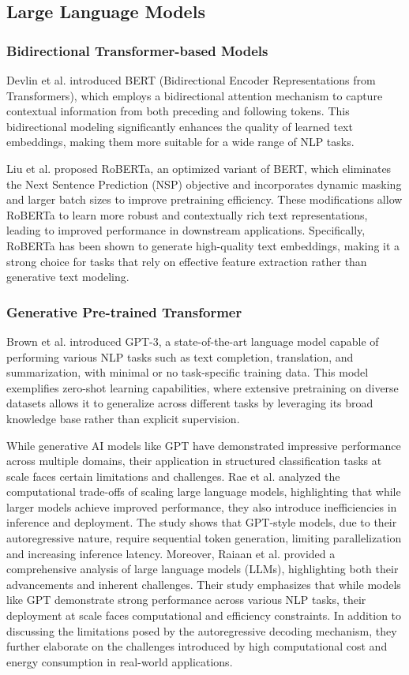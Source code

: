 \subsection{Large Language Models}
\subsubsection{Bidirectional Transformer-based Models}
Devlin et al. \cite{devlin2018bert} introduced BERT (Bidirectional Encoder Representations from Transformers), which employs a bidirectional attention mechanism to capture contextual information from both preceding and following tokens. This bidirectional modeling significantly enhances the quality of learned text embeddings, making them more suitable for a wide range of NLP tasks. 

Liu et al. \cite{liu2019roberta} proposed RoBERTa, an optimized variant of BERT, which eliminates the Next Sentence Prediction (NSP) objective and incorporates dynamic masking and larger batch sizes to improve pretraining efficiency. These modifications allow RoBERTa to learn more robust and contextually rich text representations, leading to improved performance in downstream applications. Specifically, RoBERTa has been shown to generate high-quality text embeddings, making it a strong choice for tasks that rely on effective feature extraction rather than generative text modeling.

\subsubsection{Generative Pre-trained Transformer}
Brown et al. \cite{brown2020language} introduced GPT-3, a state-of-the-art language model capable of performing various NLP tasks such as text completion, translation, and summarization, with minimal or no task-specific training data. This model exemplifies zero-shot learning capabilities, where extensive pretraining on diverse datasets allows it to generalize across different tasks by leveraging its broad knowledge base rather than explicit supervision.


While generative AI models like GPT have demonstrated impressive performance across multiple domains, their application in structured classification tasks at scale faces certain limitations and challenges.
Rae et al. \cite{Rae2021} analyzed the computational trade-offs of scaling large language models, highlighting that while larger models achieve improved performance, they also introduce inefficiencies in inference and deployment. The study shows that GPT-style models, due to their autoregressive nature, require sequential token generation, limiting parallelization and increasing inference latency.
Moreover, Raiaan et al. \cite{10433480} provided a comprehensive analysis of large language models (LLMs), highlighting both their advancements and inherent challenges. Their study emphasizes that while models like GPT demonstrate strong performance across various NLP tasks, their deployment at scale faces computational and efficiency constraints. In addition to discussing the limitations posed by the autoregressive decoding mechanism, they further elaborate on the challenges introduced by high computational cost and energy consumption in real-world applications.


